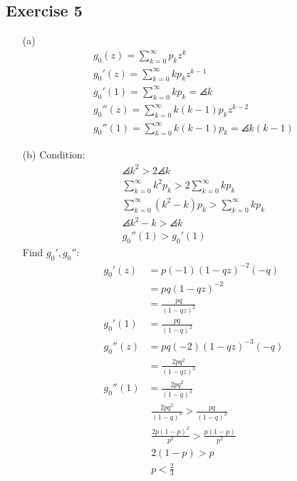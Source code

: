 \documentclass{article}
\begin{document}
\newpage

\subsection*{Exercise 5}

\begin{enumerate}
  \item[(a)]
  \begin{gather*}
    g_0(z) = \sum_{k = 0}^{\infty} p_k z^k \\
    g_0'(z) = \sum_{k = 0}^{\infty} k p_k z^{k - 1} \\
    g_0'(1) = \sum_{k = 0}^{\infty} k p_k = \angles{k} \\
    g_0''(z) = \sum_{k = 0}^{\infty} k(k - 1) p_k z^{k - 2} \\
    g_0''(1) = \sum_{k = 0}^{\infty} k(k - 1) p_k = \angles{k(k - 1)}
  \end{gather*}

  \item[(b)]
  Condition:
  \begin{gather*}
    \angles{k^2} > 2 \angles{k} \\
    \sum_{k = 0}^{\infty} k^2 p_k > 2 \sum_{k = 0}^{\infty} k p_k \\
    \sum_{k = 0}^{\infty} (k^2 - k) p_k > \sum_{k = 0}^{\infty} k p_k \\
    \angles{k^2 - k} > \angles{k} \\
    g_0''(1) > g_0'(1)
  \end{gather*}
  Find \( g_0', g_0'' \):
  \begin{align*}
    g_0'(z) &= p(-1)(1 - qz)^{-2}(-q) \\
    &= pq(1 - qz)^{-2} \\
    &= \frac{pq}{(1 - qz)^2} \\
    g_0'(1) &= \frac{pq}{(1 - q)^2} \\
    g_0''(z) &= pq(-2)(1 - qz)^{-3}(-q) \\
    &= \frac{2pq^2}{(1 - qz)^3} \\
    g_0''(1) &= \frac{2pq^2}{(1 - q)^3}
  \end{align*}
  \begin{gather*}
    \frac{2pq^2}{(1 - q)^3} > \frac{pq}{(1 - q)^2} \\
    \frac{2p(1 - p)^2}{p^3} > \frac{p(1 - p)}{p^2} \\
    2(1 - p) > p \\
    \boxed{p < \frac{2}{3}}
  \end{gather*}
\end{enumerate}
\end{document}
